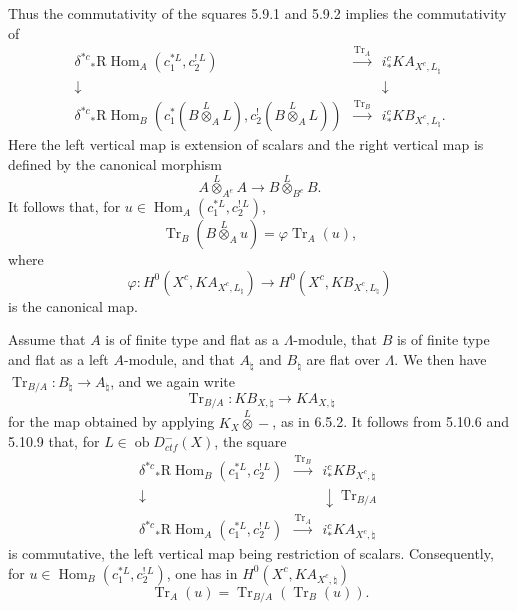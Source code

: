 \documentclass[12pt]{article}
\newcommand{\Hom}{\operatorname{Hom}}
\newcommand{\RHom}{\mathrm R\!\operatorname{Hom}}
\newcommand{\Tr}{\operatorname{Tr}}
\newcommand{\ob}{\operatorname{ob}}
\begin{document}
Thus the commutativity of the squares 5.9.1 and 5.9.2 implies the commutativity of
\begin{equation}\tag{6.7.1}
\begin{array}{ccc}
\delta^{*c}{}_*\RHom_A(c_1^{*L},c_2^{!\,L}) & \xrightarrow{\Tr_A} & i_*^c K A_{X^c,L_\natural} \\[6pt]
\downarrow & & \downarrow \\[6pt]
\delta^{*c}{}_*\RHom_B(c_1^*(B\overset{L}{\otimes}_A L),c_2^{!}(B\overset{L}{\otimes}_A L)) & \xrightarrow{\Tr_B} & i_*^c K B_{X^c,L_\natural} .
\end{array}
\end{equation}
Here the left vertical map is extension of scalars and the right vertical map is
defined by the canonical morphism
\[
      A\overset{L}{\otimes}_{A^e}A\longrightarrow
      B\overset{L}{\otimes}_{B^e}B.
\]
It follows that, for $u\in\Hom_A(c_1^{*L},c_2^{!\,L})$,
\begin{equation}\tag{6.7.2}
      \Tr_B(B\overset{L}{\otimes}_A u)=\varphi\Tr_A(u),
\end{equation}
where
\[
  \varphi:H^0(X^c,K A_{X^c,L_\natural})\longrightarrow
  H^0(X^c,K B_{X^c,L_\natural})
\]
is the canonical map.

Assume that $A$ is of finite type and flat as a $\Lambda$-module, that $B$ is of
finite type and flat as a left $A$-module, and that $A_\natural$ and $B_\natural$ are
flat over $\Lambda$. We then have $\Tr_{B/A}:B_\natural\to A_\natural$, and we again
write
\begin{equation}\tag{6.7.3}
     \Tr_{B/A}:K B_{X,\natural}\longrightarrow K A_{X,\natural}
\end{equation}
for the map obtained by applying $K_X\overset{L}{\otimes}-$, as in 6.5.2. It follows
from 5.10.6 and 5.10.9 that, for $L\in\ob D_{ctf}^{-}(X)$, the square
\begin{equation}\tag{6.7.4}
\begin{array}{ccc}
\delta^{*c}{}_*\RHom_B(c_1^{*L},c_2^{!\,L}) & \xrightarrow{\Tr_B} & i_*^c K B_{X^c,\natural} \\[6pt]
\downarrow & & \downarrow\scriptstyle \Tr_{B/A} \\[6pt]
\delta^{*c}{}_*\RHom_A(c_1^{*L},c_2^{!\,L}) & \xrightarrow{\Tr_A} & i_*^c K A_{X^c,\natural}
\end{array}
\end{equation}
is commutative, the left vertical map being restriction of scalars. Consequently, for
$u\in\Hom_B(c_1^{*L},c_2^{!\,L})$, one has in
$H^0(X^c,K A_{X^c,\natural})$
\begin{equation}\tag{6.7.5}
      \Tr_A(u)=\Tr_{B/A}(\Tr_B(u)).
\end{equation}
\end{document}
